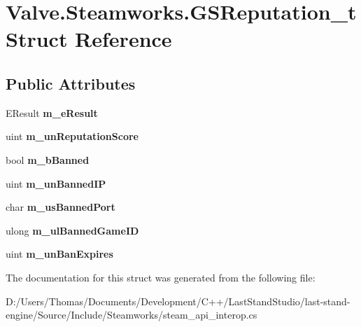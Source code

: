 \hypertarget{structValve_1_1Steamworks_1_1GSReputation__t}{}\section{Valve.\+Steamworks.\+G\+S\+Reputation\+\_\+t Struct Reference}
\label{structValve_1_1Steamworks_1_1GSReputation__t}
\subsection*{Public Attributes}
\begin{DoxyCompactItemize}
\item 
\hypertarget{structValve_1_1Steamworks_1_1GSReputation__t_a68b2e559af15ff659f73b34824b27dd3}{}E\+Result {\bfseries m\+\_\+e\+Result}\label{structValve_1_1Steamworks_1_1GSReputation__t_a68b2e559af15ff659f73b34824b27dd3}

\item 
\hypertarget{structValve_1_1Steamworks_1_1GSReputation__t_ae49ffb06046ce8ef960ede0dab6027ca}{}uint {\bfseries m\+\_\+un\+Reputation\+Score}\label{structValve_1_1Steamworks_1_1GSReputation__t_ae49ffb06046ce8ef960ede0dab6027ca}

\item 
\hypertarget{structValve_1_1Steamworks_1_1GSReputation__t_aa383e913b596b7853a8fe26ce8978fec}{}bool {\bfseries m\+\_\+b\+Banned}\label{structValve_1_1Steamworks_1_1GSReputation__t_aa383e913b596b7853a8fe26ce8978fec}

\item 
\hypertarget{structValve_1_1Steamworks_1_1GSReputation__t_af7a2ae5ac02bb2185d0d3779aee04909}{}uint {\bfseries m\+\_\+un\+Banned\+I\+P}\label{structValve_1_1Steamworks_1_1GSReputation__t_af7a2ae5ac02bb2185d0d3779aee04909}

\item 
\hypertarget{structValve_1_1Steamworks_1_1GSReputation__t_a967c2250072b8b87aa3cd9b705c5615b}{}char {\bfseries m\+\_\+us\+Banned\+Port}\label{structValve_1_1Steamworks_1_1GSReputation__t_a967c2250072b8b87aa3cd9b705c5615b}

\item 
\hypertarget{structValve_1_1Steamworks_1_1GSReputation__t_abe94f6caf36fc9756ee247faad7f9b49}{}ulong {\bfseries m\+\_\+ul\+Banned\+Game\+I\+D}\label{structValve_1_1Steamworks_1_1GSReputation__t_abe94f6caf36fc9756ee247faad7f9b49}

\item 
\hypertarget{structValve_1_1Steamworks_1_1GSReputation__t_a1b49ee0b9ab28e6da9d0b8dbecfa4a43}{}uint {\bfseries m\+\_\+un\+Ban\+Expires}\label{structValve_1_1Steamworks_1_1GSReputation__t_a1b49ee0b9ab28e6da9d0b8dbecfa4a43}

\end{DoxyCompactItemize}


The documentation for this struct was generated from the following file\+:\begin{DoxyCompactItemize}
\item 
D\+:/\+Users/\+Thomas/\+Documents/\+Development/\+C++/\+Last\+Stand\+Studio/last-\/stand-\/engine/\+Source/\+Include/\+Steamworks/steam\+\_\+api\+\_\+interop.\+cs\end{DoxyCompactItemize}
